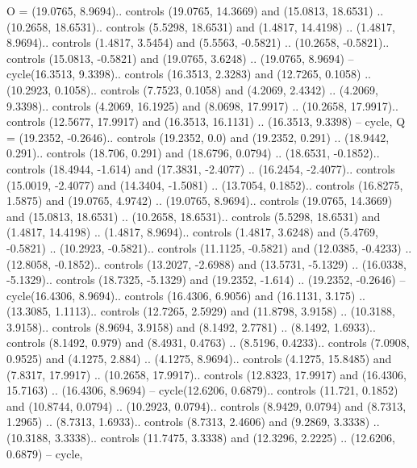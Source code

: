 {O} = {(19.0765, 8.9694).. controls (19.0765, 14.3669) and (15.0813, 18.6531) .. (10.2658, 18.6531).. controls (5.5298, 18.6531) and (1.4817, 14.4198) .. (1.4817, 8.9694).. controls (1.4817, 3.5454) and (5.5563, -0.5821) .. (10.2658, -0.5821).. controls (15.0813, -0.5821) and (19.0765, 3.6248) .. (19.0765, 8.9694) -- cycle(16.3513, 9.3398).. controls (16.3513, 2.3283) and (12.7265, 0.1058) .. (10.2923, 0.1058).. controls (7.7523, 0.1058) and (4.2069, 2.4342) .. (4.2069, 9.3398).. controls (4.2069, 16.1925) and (8.0698, 17.9917) .. (10.2658, 17.9917).. controls (12.5677, 17.9917) and (16.3513, 16.1131) .. (16.3513, 9.3398) -- cycle},
{Q} = {(19.2352, -0.2646).. controls (19.2352, 0.0) and (19.2352, 0.291) .. (18.9442, 0.291).. controls (18.706, 0.291) and (18.6796, 0.0794) .. (18.6531, -0.1852).. controls (18.4944, -1.614) and (17.3831, -2.4077) .. (16.2454, -2.4077).. controls (15.0019, -2.4077) and (14.3404, -1.5081) .. (13.7054, 0.1852).. controls (16.8275, 1.5875) and (19.0765, 4.9742) .. (19.0765, 8.9694).. controls (19.0765, 14.3669) and (15.0813, 18.6531) .. (10.2658, 18.6531).. controls (5.5298, 18.6531) and (1.4817, 14.4198) .. (1.4817, 8.9694).. controls (1.4817, 3.6248) and (5.4769, -0.5821) .. (10.2923, -0.5821).. controls (11.1125, -0.5821) and (12.0385, -0.4233) .. (12.8058, -0.1852).. controls (13.2027, -2.6988) and (13.5731, -5.1329) .. (16.0338, -5.1329).. controls (18.7325, -5.1329) and (19.2352, -1.614) .. (19.2352, -0.2646) -- cycle(16.4306, 8.9694).. controls (16.4306, 6.9056) and (16.1131, 3.175) .. (13.3085, 1.1113).. controls (12.7265, 2.5929) and (11.8798, 3.9158) .. (10.3188, 3.9158).. controls (8.9694, 3.9158) and (8.1492, 2.7781) .. (8.1492, 1.6933).. controls (8.1492, 0.979) and (8.4931, 0.4763) .. (8.5196, 0.4233).. controls (7.0908, 0.9525) and (4.1275, 2.884) .. (4.1275, 8.9694).. controls (4.1275, 15.8485) and (7.8317, 17.9917) .. (10.2658, 17.9917).. controls (12.8323, 17.9917) and (16.4306, 15.7163) .. (16.4306, 8.9694) -- cycle(12.6206, 0.6879).. controls (11.721, 0.1852) and (10.8744, 0.0794) .. (10.2923, 0.0794).. controls (8.9429, 0.0794) and (8.7313, 1.2965) .. (8.7313, 1.6933).. controls (8.7313, 2.4606) and (9.2869, 3.3338) .. (10.3188, 3.3338).. controls (11.7475, 3.3338) and (12.3296, 2.2225) .. (12.6206, 0.6879) -- cycle},

